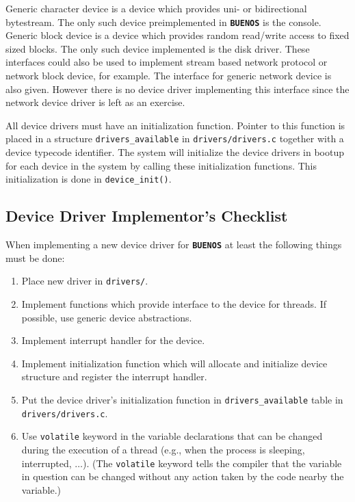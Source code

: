 \documentclass[twoside,a4paper]{report}
\newcommand{\buenos}{\texttt{\textbf{BUENOS}}}
\begin{document}
Generic character device is a device which provides uni- or
bidirectional bytestream. The only such device preimplemented in
\buenos{} is the console. Generic block device is a device which
provides random read/write access to fixed sized blocks. The only such
device implemented is the disk driver. These interfaces could also be
used to implement stream based network protocol or network block
device, for example. The interface for generic network device is also
given. However there is no device driver implementing this interface
since the network device driver is left as an exercise.

All device drivers must have an initialization function. Pointer to
this function is placed in a structure \texttt{drivers\_available}
 in
\texttt{drivers/drivers.c} together with a device typecode identifier.
The system will initialize the device drivers in bootup for each
device in the system by calling these initialization functions. This
initialization is done in \texttt{device\_init()}.

\subsection{Device Driver Implementor's Checklist}
\label{sec:checklist}


When implementing a new device driver for \buenos{} at least the
following things must be done:

\begin{enumerate}
\item Place new driver in \texttt{drivers/}.
\item Implement functions which provide interface to the device for
threads. If possible, use generic device abstractions.
\item Implement interrupt handler for the device.
\item Implement initialization function which will allocate and
initialize device structure and register the interrupt handler.
\item Put the device driver's initialization function in
\texttt{drivers\_available} table in \texttt{drivers/drivers.c}.
\item Use \texttt{volatile}  keyword
  in the variable declarations that can be changed during the
  execution of a thread (e.g., when the process is sleeping,
  interrupted, $\ldots$). (The \texttt{volatile} keyword tells the
  compiler that the variable in question can be changed without any
  action taken by the code nearby the variable.)
\end{enumerate}
\end{document}

